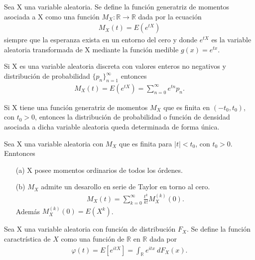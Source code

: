\begin{defi}
    Sea X una variable aleatoria. Se define la función generatriz de momentos asociada a X como una función $M_X: \mathbb{R} \longrightarrow \mathbb{R}$ dada por la ecuación
    \begin{align*}
        M_X(t) = E(e^{tX})
    \end{align*}
    siempre que la esperanza exista en un entorno del cero y donde $e^{tX}$ es la variable aleatoria transformada de X mediante la función medible $g(x) = e^{tx}$.
\end{defi}

\begin{obs}
    Si X es una variable aleatoria discreta con valores enteros no negativos y distribución de probabilidad $\{p_n\}_{n=1}^{\infty}$ entonces
    \begin{align*}
        M_X(t) = E(e^{tX}) = \sum_{n=0}^{\infty}{e^{tn}p_n}.
    \end{align*}
\end{obs}

\begin{teo}
    Si X tiene una función generatriz de momentos $M_X$ que es finita en $(-t_0, t_0)$, con $t_0 > 0$, entonces la distribución de probabilidad o función de densidad asociada a dicha variable aleatoria queda determinada de forma única.
\end{teo}

\begin{teo}
    Sea X una variable aleatoria con $M_X$ que es finita para $|t| < t_0$, con $t_0 > 0$. Enntonces
    \begin{enumerate}
        \item[(a)] X posee momentos ordinarios de todos los órdenes.
        \item[(b)] $M_X$ admite un desarollo en serie de Taylor en torno al cero.
              \begin{align*}
                  M_X(t) = \sum_{k=0}^{\infty}{\frac{t^k}{k!}M_X^{(k)}(0)}.
              \end{align*}
              Además $M_X^{(k)}(0) = E(X^k)$.
    \end{enumerate}
\end{teo}

\begin{defi}
    Sea X una variable aleatoria con función de distribución $F_X$. Se define la función caractrística de $X$ como una función de $\mathbb{R}$ en $\mathbb{R}$ dada por
    \begin{align*}
        \varphi(t) = E\left[e^{itX}\right] = \int_{\mathbb{R}}{e^{itx} \ dF_X(x)}.
    \end{align*}
\end{defi}

